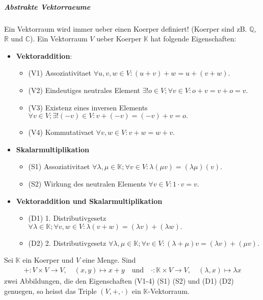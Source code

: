 \documentclass[12pt]{article}
\begin{document}
\vspace{1cm}
\subparagraph{\large Abstrakte Vektorraeume}
\normalsize
\begin{flushleft}
    Ein Vektorraum wird immer ueber einen Koerper definiert! (Koerper sind zB. $\mathbb{Q}$, $\mathbb{R}$ und $\mathbb{C}$).
    Ein Vektorraum $V$ ueber Koerper $\mathbb{K}$ hat folgende Eigenschaften:
    \begin{itemize}
        \item \textbf{Vektoraddition}:
        \begin{itemize}
            \item (V1) Assoziativitaet $\forall u,v,w \in V: (u + v) + w = u + (v + w).$
            \item (V2) Eindeutiges neutrales Element $\exists ! o \in V; \forall v \in V: o + v = v + o = v.$
            \item (V3) Existenz eines inversen Elements $\forall v \in V; \exists !(-v)\in V: v + (-v) = (-v) + v = o.$
            \item (V4) Kommutativaet $\forall v,w \in V: v + w = w + v.$
        \end{itemize}
        \item \textbf{Skalarmultiplikation}
        \begin{itemize}
            \item (S1) Assoziativitaet $\forall \lambda , \mu \in \mathbb{K}; \forall v \in V: \lambda(\mu v) = (\lambda \mu)(v).$
            \item (S2) Wirkung des neutralen Elements $\forall v \in V: 1 \cdot v = v.$
        \end{itemize}
        \item \textbf{Vektoraddition und Skalarmultiplikation}
        \begin{itemize}
            \item (D1) 1. Distributivgesetz $\forall \lambda \in \mathbb{K}; \forall v,w \in V: \lambda(v + w) = (\lambda v) + (\lambda w).$
            \item (D2) 2. Distributivgesetz $\forall \lambda , \mu \in \mathbb{K}; \forall v \in V: (\lambda + \mu)v = (\lambda v) + (\mu v).$
        \end{itemize}
    \end{itemize}
    Sei $\mathbb{K}$ ein Koerper und $V$ eine Menge. Sind \begin{align}
        +: V \times V \rightarrow V, \quad (x,y) \mapsto x + y \quad \text{und} \quad \cdot: \mathbb{K} \times V \to V, \quad (\lambda,x) \mapsto \lambda x
    \end{align}
    zwei Abbildungen, die den Eigenschaften (V1-4) (S1) (S2) und (D1) (D2) genuegen, so heisst das Triple $(V,+,\cdot)$ ein $\mathbb{K}$-Vektorraum.
\end{flushleft}
\end{document}
